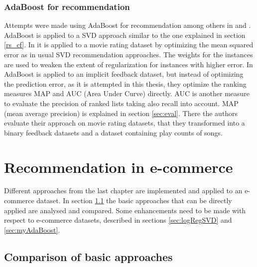 \documentclass[10pt]{reportMaster}
\begin{document}
\subsection{AdaBoost for recommendation}
\label{sec:adaBoostForRecommendation}
Attempts were made using AdaBoost for recommendation among others in \cite{boostingCFRatings} and \cite{boostingAUC}.
AdaBoost is applied to a SVD approach similar to the one explained in section \ref{rs_cf}.
In \cite{boostingCFRatings} it is applied to a movie rating dataset by optimizing the mean squared error as in usual SVD recommendation approaches.
The weights for the instances are used to weaken the extent of regularization for instances with higher error.
In \cite{boostingAUC} AdaBoost is applied to an implicit feedback dataset, but instead of optimizing the prediction error, as it is attempted in this thesis, they optimize the ranking measures MAP and AUC (Area Under Curve) directly.
AUC is another measure to evaluate the precision of ranked lists taking also recall into account.
MAP (mean average precision) is explained in section \ref{sec:eval}.
There the authors evaluate their approach on movie rating datasets, that they transformed into a binary feedback datasets and a dataset containing play counts of songs.











\chapter{Recommendation in e-commerce}
\label{sec:ecommerceRec}

Different approaches from the last chapter are implemented and applied to an e-commerce dataset.
In section \ref{sec:comparison} the basic approaches that can be directly applied are analysed and compared.
Some enhancements need to be made with respect to e-commerce datasets, described in sections \ref{sec:logRegSVD} and \ref{sec:myAdaBoost}.


\section{Comparison of basic approaches}
\label{sec:comparison}
\end{document}
